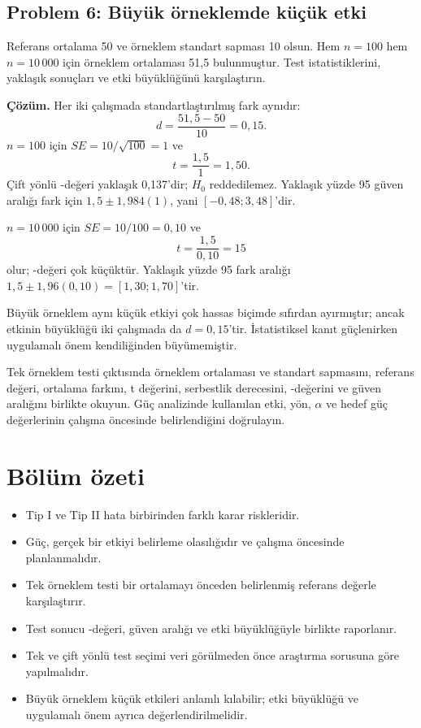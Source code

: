 \subsection*{Problem 6: Büyük örneklemde küçük etki}

Referans ortalama 50 ve örneklem standart sapması 10 olsun. Hem $n=100$ hem
$n=10\,000$ için örneklem ortalaması 51,5 bulunmuştur. Test istatistiklerini,
yaklaşık sonuçları ve etki büyüklüğünü karşılaştırın.

\textbf{Çözüm.} Her iki çalışmada standartlaştırılmış fark aynıdır:
\[
d=\frac{51{,}5-50}{10}=0{,}15.
\]
$n=100$ için $SE=10/\sqrt{100}=1$ ve
\[
t=\frac{1{,}5}{1}=1{,}50.
\]
Çift yönlü \pval-değeri yaklaşık 0,137'dir; $H_0$ reddedilemez. Yaklaşık yüzde 95
güven aralığı fark için $1{,}5\pm1{,}984(1)$, yani
$[-0{,}48;3{,}48]$'dir.

$n=10\,000$ için $SE=10/100=0{,}10$ ve
\[
t=\frac{1{,}5}{0{,}10}=15
\]
olur; \pval-değeri çok küçüktür. Yaklaşık yüzde 95 fark aralığı
$1{,}5\pm1{,}96(0{,}10)=[1{,}30;1{,}70]$'tir.

Büyük örneklem aynı küçük etkiyi çok hassas biçimde sıfırdan ayırmıştır;
ancak etkinin büyüklüğü iki çalışmada da $d=0{,}15$'tir. İstatistiksel kanıt
güçlenirken uygulamalı önem kendiliğinden büyümemiştir.

\begin{outputguidebox}
Tek örneklem \tstat testi çıktısında örneklem ortalaması ve standart sapmasını,
referans değeri, ortalama farkını, t değerini, serbestlik derecesini,
\pval-değerini ve güven aralığını birlikte okuyun. Güç analizinde kullanılan
etki, yön, $\alpha$ ve hedef güç değerlerinin çalışma öncesinde belirlendiğini
doğrulayın.
\end{outputguidebox}





\section{Bölüm özeti}

\begin{itemize}
  \item Tip I ve Tip II hata birbirinden farklı karar riskleridir.
  \item Güç, gerçek bir etkiyi belirleme olasılığıdır ve çalışma öncesinde planlanmalıdır.
  \item Tek örneklem \tstat testi bir ortalamayı önceden belirlenmiş referans değerle karşılaştırır.
  \item Test sonucu \pval-değeri, güven aralığı ve etki büyüklüğüyle birlikte raporlanır.
  \item Tek ve çift yönlü test seçimi veri görülmeden önce araştırma sorusuna
  göre yapılmalıdır.
  \item Büyük örneklem küçük etkileri anlamlı kılabilir; etki büyüklüğü ve
  uygulamalı önem ayrıca değerlendirilmelidir.
\end{itemize}


